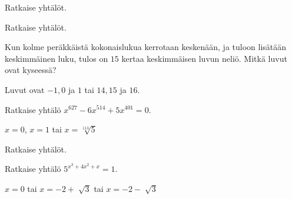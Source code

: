 \begin{tehtavasivu}
\begin{tehtava}
    Ratkaise yhtälöt.
    \begin{vastaus}
    \end{vastaus}
\end{tehtava}

\begin{tehtava}
    Ratkaise yhtälöt.
    \begin{vastaus}
    \end{vastaus}
\end{tehtava}

\begin{tehtava}
Kun kolme peräkkäistä kokonaislukua kerrotaan keskenään, ja tuloon lisätään keskimmäinen luku, tulos on $15$ kertaa keskimmäisen luvun neliö. Mitkä luvut ovat kyseessä?
    \begin{vastaus}
	Luvut ovat $-1, 0$ ja $1$ tai $14, 15$ ja $16$.
    \end{vastaus}
\end{tehtava}

\begin{tehtava}
	Ratkaise yhtälö $x^{627} - 6x^{514} + 5x^{401} = 0$.
	\begin{vastaus}
		$x = 0$, $x = 1$ tai $x = \sqrt[113]{5}$
	\end{vastaus}
\end{tehtava}

\begin{tehtava}
    Ratkaise yhtälöt.
    \begin{vastaus}
    \end{vastaus}
\end{tehtava}

\begin{tehtava}
 	Ratkaise yhtälö $5^{x^3+4x^2+x}=1$. 
	\begin{vastaus}
	$x=0$ tai $x=-2 + \sqrt[]{3}$ tai $x=-2 - \sqrt[]{3}$
	\end{vastaus}
\end{tehtava}


\end{tehtavasivu}
